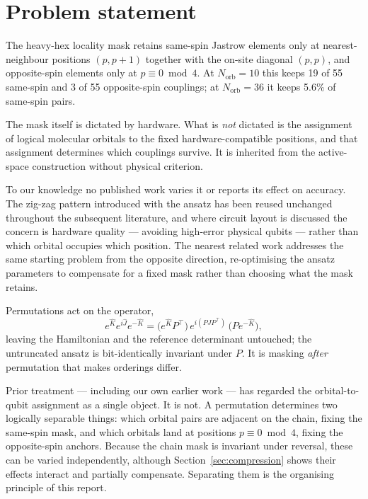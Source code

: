 \documentclass[11pt,a4paper]{article}
\begin{document}
\tableofcontents
\newpage

\section{Problem statement}

The heavy-hex locality mask retains same-spin Jastrow elements only at
nearest-neighbour positions $(p,p+1)$ together with the on-site diagonal
$(p,p)$, and opposite-spin elements only at $p \equiv 0 \bmod 4$. At
$N_{\text{orb}}=10$ this keeps 19 of 55 same-spin and 3 of 55 opposite-spin
couplings; at $N_{\text{orb}}=36$ it keeps 5.6\% of same-spin pairs.

The mask itself is dictated by hardware. What is \emph{not} dictated is the
assignment of logical molecular orbitals to the fixed hardware-compatible
positions, and that assignment determines which couplings survive. It is
inherited from the active-space construction without physical criterion.

To our knowledge no published work varies it or reports its effect on
accuracy. The zig-zag pattern introduced with the ansatz has been reused
unchanged throughout the subsequent literature, and where circuit layout is
discussed the concern is hardware quality --- avoiding high-error physical
qubits --- rather than which orbital occupies which position. The nearest
related work addresses the same starting problem from the opposite direction,
re-optimising the ansatz parameters to compensate for a fixed mask rather
than choosing what the mask retains.

Permutations act on the operator,
\begin{equation}
e^{\hat K} e^{i\hat J} e^{-\hat K}
= \bigl(e^{\hat K}P^{\top}\bigr)\, e^{i(PJP^{\top})}\, \bigl(Pe^{-\hat K}\bigr),
\end{equation}
leaving the Hamiltonian and the reference determinant untouched; the
untruncated ansatz is bit-identically invariant under $P$. It is masking
\emph{after} permutation that makes orderings differ.

Prior treatment --- including our own earlier work --- has regarded the
orbital-to-qubit assignment as a single object. It is not. A permutation
determines two logically separable things: which orbital pairs are adjacent
on the chain, fixing the same-spin mask, and which orbitals land at positions
$p \equiv 0 \bmod 4$, fixing the opposite-spin anchors. Because the chain mask
is invariant under reversal, these can be varied independently, although
Section~\ref{sec:compression} shows their effects interact and partially
compensate. Separating them is the organising principle of this report.
\end{document}
